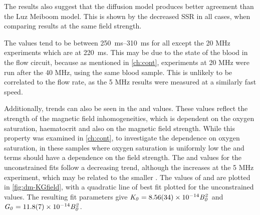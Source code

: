 The results also suggest that the diffusion model produces better agreement than the Luz Meiboom model.
This is shown by the decreased SSR in all cases, when comparing results at the same field strength.

The \TtwoO values tend to be between \SIrange{250}{310}{ms} for all except the 20 MHz experiments which are at \SI{220}{ms}.
This may be due to the state of the blood in the flow circuit, because as mentioned in \autoref{ch:cont}, experiments at 20 MHz were run after the 40 MHz, using the same blood sample.
This is unlikely to be correlated to the flow rate, as the 5 MHz results were measured at a similarly fast speed.

Additionally, trends can also be seen in the \Kzero and \Gzero values.
These values reflect the strength of the magnetic field inhomogeneities, which is dependent on the oxygen saturation, haematocrit and also on the magnetic field strength.
While this property was examined in \autoref{ch:cont}, to investigate the dependence on oxygen saturation, in these samples where oxygen saturation is uniformly low the \Kzero and \Gzero terms should have a dependence on the field strength.
The \Kzero and \Gzero values for the unconstrained fits follow a decreasing trend, although the \Gzero increases at the 5 MHz experiment, which may be related to the smaller \rc.
The values of \Kzero and \Gzero are plotted in \autoref{fig:dm-KGfield}, with a quadratic line of best fit plotted for the unconstrained \Kzero values. The resulting fit parameters give
 $\mathit{K_0=\num{8.56\pm0.34e-14}B_0^2}$ and $\mathit{G_0 = \num{11.8\pm0.7e-14}B_0^2}$.

